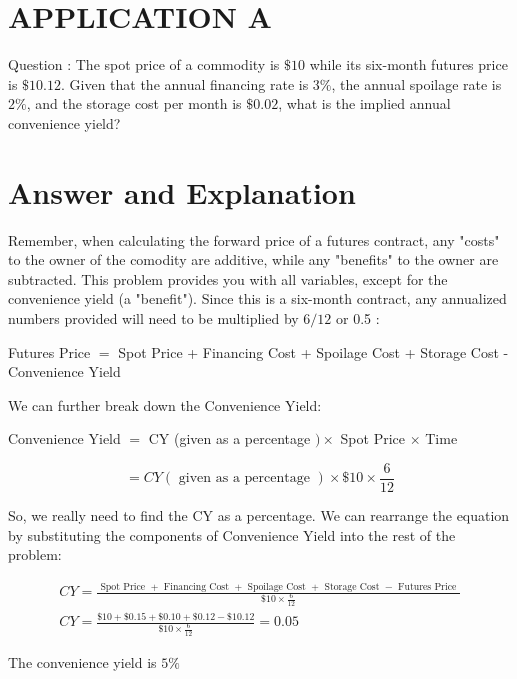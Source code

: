 \documentclass[11pt]{article}
\begin{document}
\section*{APPLICATION A}
Question : The spot price of a commodity is $\$ 10$ while its six-month futures price is $\$ 10.12$. Given that the annual financing rate is $3 \%$, the annual spoilage rate is $2 \%$, and the storage cost per month is $\$ 0.02$, what is the implied annual convenience yield?

\section*{Answer and Explanation}
Remember, when calculating the forward price of a futures contract, any "costs" to the owner of the comodity are additive, while any "benefits" to the owner are subtracted. This problem provides you with all variables, except for the convenience yield (a "benefit"). Since this is a six-month contract, any annualized numbers provided will need to be multiplied by $6 / 12$ or 0.5 :

Futures Price $=$ Spot Price + Financing Cost + Spoilage Cost + Storage Cost - Convenience Yield

We can further break down the Convenience Yield:

Convenience Yield $=$ CY (given as a percentage $) \times$ Spot Price $\times$ Time

$$
=C Y(\text { given as a percentage }) \times \$ 10 \times \frac{6}{12}
$$

So, we really need to find the $\mathrm{CY}$ as a percentage. We can rearrange the equation by substituting the components of Convenience Yield into the rest of the problem:

$$
\begin{gathered}
C Y=\frac{\text { Spot Price }+ \text { Financing Cost }+ \text { Spoilage Cost }+ \text { Storage Cost }- \text { Futures Price }}{\$ 10 \times \frac{6}{12}} \\
C Y=\frac{\$ 10+\$ 0.15+\$ 0.10+\$ 0.12-\$ 10.12}{\$ 10 \times \frac{6}{12}}=0.05
\end{gathered}
$$

The convenience yield is $5 \%$
\end{document}
